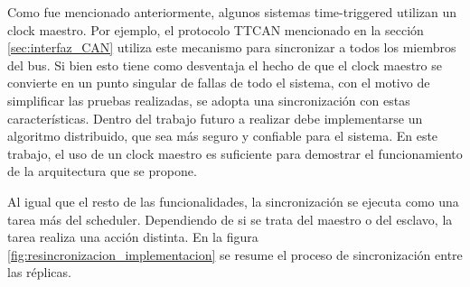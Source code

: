 
Como fue mencionado anteriormente, algunos sistemas time-triggered utilizan un clock maestro. Por ejemplo, el protocolo TTCAN mencionado en la sección \ref{sec:interfaz_CAN} utiliza este mecanismo para sincronizar a todos los miembros del bus. Si bien esto tiene como desventaja el hecho de que el clock maestro se convierte en un punto singular de fallas de todo el sistema, con el motivo de simplificar las pruebas realizadas, se adopta una sincronización con estas características. Dentro del trabajo futuro a realizar debe implementarse un algoritmo distribuido, que sea más seguro y confiable para el sistema. En este trabajo, el uso de un clock maestro es suficiente para demostrar el funcionamiento de la arquitectura que se propone. %


Al igual que el resto de las funcionalidades, la sincronización se ejecuta como una tarea más del scheduler. Dependiendo de si se trata del maestro o del esclavo, la tarea realiza una acción distinta. En la figura \ref{fig:resincronizacion_implementacion} se resume el proceso de sincronización entre las réplicas.

